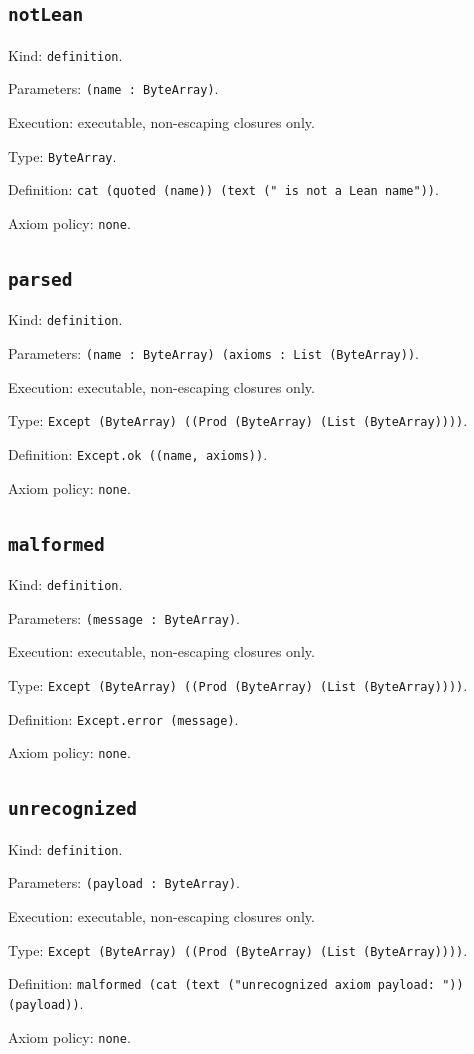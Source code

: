 \documentclass[11pt]{article}
\begin{document}
\subsection*{\texttt{notLean}}
\noindent Kind: \texttt{definition}.\par
\noindent Parameters: \texttt{(name : ByteArray)}.\par
\noindent Execution: executable, non-escaping closures only.\par
\noindent Type: \texttt{ByteArray}.\par
\noindent Definition: \texttt{cat (quoted (name)) (text (" is not a Lean name"))}.\par
\noindent Axiom policy: \texttt{none}.\par
\subsection*{\texttt{parsed}}
\noindent Kind: \texttt{definition}.\par
\noindent Parameters: \texttt{(name : ByteArray) (axioms : List (ByteArray))}.\par
\noindent Execution: executable, non-escaping closures only.\par
\noindent Type: \texttt{Except (ByteArray) ((Prod (ByteArray) (List (ByteArray))))}.\par
\noindent Definition: \texttt{Except.ok ((name, axioms))}.\par
\noindent Axiom policy: \texttt{none}.\par
\subsection*{\texttt{malformed}}
\noindent Kind: \texttt{definition}.\par
\noindent Parameters: \texttt{(message : ByteArray)}.\par
\noindent Execution: executable, non-escaping closures only.\par
\noindent Type: \texttt{Except (ByteArray) ((Prod (ByteArray) (List (ByteArray))))}.\par
\noindent Definition: \texttt{Except.error (message)}.\par
\noindent Axiom policy: \texttt{none}.\par
\subsection*{\texttt{unrecognized}}
\noindent Kind: \texttt{definition}.\par
\noindent Parameters: \texttt{(payload : ByteArray)}.\par
\noindent Execution: executable, non-escaping closures only.\par
\noindent Type: \texttt{Except (ByteArray) ((Prod (ByteArray) (List (ByteArray))))}.\par
\noindent Definition: \texttt{malformed (cat (text ("unrecognized axiom payload: ")) (payload))}.\par
\noindent Axiom policy: \texttt{none}.\par
\end{document}
